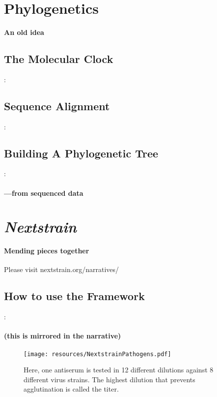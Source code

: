 \documentclass{beamer}
\begin{document}
\begin{darkframes}
  \section{Phylogenetics}

    \begin{frame}{\secname}
      \framesubtitle{An old idea}
    \end{frame}

    \subsection{The Molecular Clock}
    \begin{frame}{\secname : \subsecname}
      \framesubtitle{}
    \end{frame}

    \subsection{Sequence Alignment}
    \begin{frame}{\secname : \subsecname}
      \framesubtitle{}
    \end{frame}

    \subsection{Building A Phylogenetic Tree}
    \begin{frame}{\secname : \subsecname}
      \framesubtitle{---from sequenced data}
    \end{frame}

  \section{\textit{Nextstrain}}

    \begin{frame}{\secname}
      \framesubtitle{Mending pieces together}
      Please visit nextstrain.org/narratives/
    \end{frame}

    \subsection{How to use the Framework}
    \begin{frame}{\secname : \subsecname}
      \framesubtitle{(this is mirrored in the narrative)}
      \begin{figure}
        \texttt{[image: resources/NextstrainPathogens.pdf]}
        \caption{\footnotesize Here, one antiserum is tested in 12 different dilutions against 8 different virus strains. The highest dilution that prevents agglutination is called the titer.}
      \end{figure}
    \end{frame}


\end{darkframes}
\end{document}
